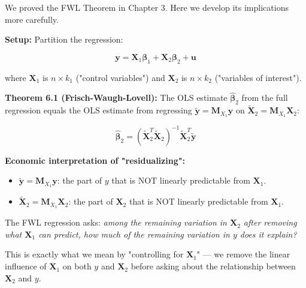 We proved the FWL Theorem in Chapter 3. Here we develop its implications more carefully.

\textbf{Setup:} Partition the regression:

\[
\mathbf{y} = \mathbf{X}_1 \boldsymbol{\beta}_1 + \mathbf{X}_2 \boldsymbol{\beta}_2 + \mathbf{u}
\]

where $\mathbf{X}_1$ is $n \times k_1$ ("control variables") and $\mathbf{X}_2$ is $n \times k_2$ ("variables of interest").

\textbf{Theorem 6.1 (Frisch-Waugh-Lovell):} The OLS estimate $\hat{\boldsymbol{\beta}}_2$ from the full regression equals the OLS estimate from regressing $\tilde{\mathbf{y}} = \mathbf{M}_{X_1}\mathbf{y}$ on $\tilde{\mathbf{X}}_2 = \mathbf{M}_{X_1}\mathbf{X}_2$:

\[
\hat{\boldsymbol{\beta}}_2 = (\tilde{\mathbf{X}}_2^T \tilde{\mathbf{X}}_2)^{-1} \tilde{\mathbf{X}}_2^T \tilde{\mathbf{y}}
\]

\textbf{Economic interpretation of "residualizing":}

\begin{itemize}
\item $\tilde{\mathbf{y}} = \mathbf{M}_{X_1}\mathbf{y}$: the part of $y$ that is NOT linearly predictable from $\mathbf{X}_1$.
\item $\tilde{\mathbf{X}}_2 = \mathbf{M}_{X_1}\mathbf{X}_2$: the part of $\mathbf{X}_2$ that is NOT linearly predictable from $\mathbf{X}_1$.
\end{itemize}

The FWL regression asks: \textit{among the remaining variation in $\mathbf{X}_2$ after removing what $\mathbf{X}_1$ can predict, how much of the remaining variation in $y$ does it explain?}

This is exactly what we mean by "controlling for $\mathbf{X}_1$" --- we remove the linear influence of $\mathbf{X}_1$ on both $y$ and $\mathbf{X}_2$ before asking about the relationship between $\mathbf{X}_2$ and $y$.

